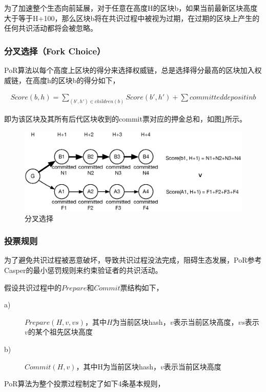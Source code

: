 为了加速整个生态向前延展，对于任意在高度H的区块b，如果当前最新区块高度大于等于H+100，那么区块b将在共识过程中被视为过期，在过期的区块上产生的任何共识活动都将会被忽略。

\subsubsection{分叉选择（Fork Choice）}
\label{por:design:fork}

PoR算法以每个高度上区块的得分来选择权威链，总是选择得分最高的区块加入权威链，在高度h的区块b的得分如下，

\begin{align}
Score(b, h) = \sum_{(b',h') \in children(b)}Score(b', h') + \sum committed deposit in b
\end{align}

即为该区块及其所有后代区块收到的commit票对应的押金总和，如图\ref{fig:fork_choice}所示。

\begin{figure}[h]
\centering
\includegraphics[width=12cm]{./figs/fork}
\caption{分叉选择}
\label{fig:fork_choice}
\end{figure}

\subsubsection{投票规则}
\label{por:design:vote}

为了避免共识过程被恶意破坏，导致共识过程没法完成，阻碍生态发展，PoR参考Casper的最小惩罚规则\cite{minimal_slash_rules}来约束验证者的共识活动。

假设共识过程中的$Prepare$和$Commit$票结构如下，
\begin{description}
\item[a)] $Prepare(H, v, vs)$，其中$H$为当前区块hash，$v$表示当前区块高度，$vs$表示$v$的某个祖先区块高度
\item[b)] $Commit(H, v)$，其中H为当前区块hash，$v$表示当前区块高度
\end{description}

PoR算法为整个投票过程制定了如下4条基本规则，

